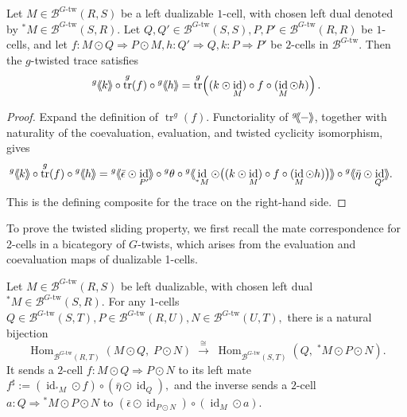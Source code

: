 \documentclass[11pt,oneside]{amsart}
\DeclareMathOperator{\tr}{tr}
\DeclareMathOperator{\id}{id}
\numberwithin{equation}{section}
\numberwithin{figure}{section}
\theoremstyle{plain}
\theoremstyle{definition}
\theoremstyle{remark}
\newcommand{\shspace}{\hspace{.5mm}} %
\newcommand{\sh}[1]{{\ensuremath{\shspace\hspace{1mm}\makebox[-1mm]{$\langle$}\makebox[0mm]{$\langle$}\hspace{1mm}{#1}\makebox[1mm]{$\rangle$}\makebox[0mm]{$\rangle$}\shspace}}}
\begin{document}
\begin{prop}\label{prop:tw-tightening}
Let \(M\in \mathcal B^{G\text{-tw}}(R,S)\) be a left dualizable
\(1\)-cell, with chosen left dual denoted by
\({}^*M\in \mathcal B^{G\text{-tw}}(S,R)\). Let
\(
Q,Q'\in \mathcal B^{G\text{-tw}}(S,S),
P,P'\in \mathcal B^{G\text{-tw}}(R,R)
\)
be \(1\)-cells, and let
\(
f\colon M\odot Q \Rightarrow P\odot M,
h\colon Q'\Rightarrow Q,
k\colon P\Rightarrow P'
\)
be \(2\)-cells in \(\mathcal B^{G\text{-tw}}\). Then the \(g\)-twisted
trace satisfies
\[
{}^g\sh{k}\circ \tr^g(f)\circ {}^g\sh{h}
=
\tr^g\!\left(
(k\odot \id_M)\circ f\circ(\id_M\odot h)
\right).
\]
\end{prop}
\begin{proof}
Expand the definition of \(\tr^g(f)\).  Functoriality of
\({}^g\!\sh{-}\), together with naturality of the coevaluation, evaluation,
and twisted cyclicity isomorphism, gives
\begin{align*}
{}^g\sh{k}\circ \tr^g(f)\circ{}^g\sh{h}
&={}^{g}\sh{\bar\epsilon\odot\id_{P'}}
  \circ{}^g\theta
  \circ{}^g\sh{
     \id_{{}^*M}\odot
     \bigl((k\odot\id_M)\circ f\circ(\id_M\odot h)\bigr)}
  \circ{}^g\sh{\bar\eta\odot\id_{Q'}}.
\end{align*}
This is the defining composite for the trace on the right-hand side.
\end{proof}

To prove the twisted sliding property, we first recall the mate correspondence for 2-cells in a bicategory of $G$-twists, which arises from the evaluation and coevaluation maps of dualizable 1-cells.

 

\begin{lemma}
\label{lem:equivariant_mate_correspondence}
Let
\(M\in \mathcal B^{G\text{-tw}}(R,S)\) be left dualizable, with chosen
left dual
\(
{}^*M\in \mathcal B^{G\text{-tw}}(S,R).\)
For any \(1\)-cells
\(
Q\in \mathcal B^{G\text{-tw}}(S,T),
P\in \mathcal B^{G\text{-tw}}(R,U),
N\in \mathcal B^{G\text{-tw}}(U,T),
\)
there is a natural bijection
\[
\operatorname{Hom}_{\mathcal B^{G\text{-tw}}(R,T)}(M\odot Q,\;P\odot N)
\;\xrightarrow{\;\cong\;}\;
\operatorname{Hom}_{\mathcal B^{G\text{-tw}}(S,T)}
  (Q,\;{}^*M\odot P\odot N).
\]
It sends a \(2\)-cell \(f\colon M\odot Q \Rightarrow P\odot N\) to its
left mate
\(
f^\sharp
:=
(\id_{{}^*M}\odot f)\circ(\bar\eta\odot\id_Q),
\)
and the inverse sends a \(2\)-cell
\(a\colon Q\Rightarrow{}^*M\odot P\odot N\) to
\(
(\bar\epsilon\odot\id_{P\odot N})\circ(\id_M\odot a).
\)
\end{lemma}
\end{document}
